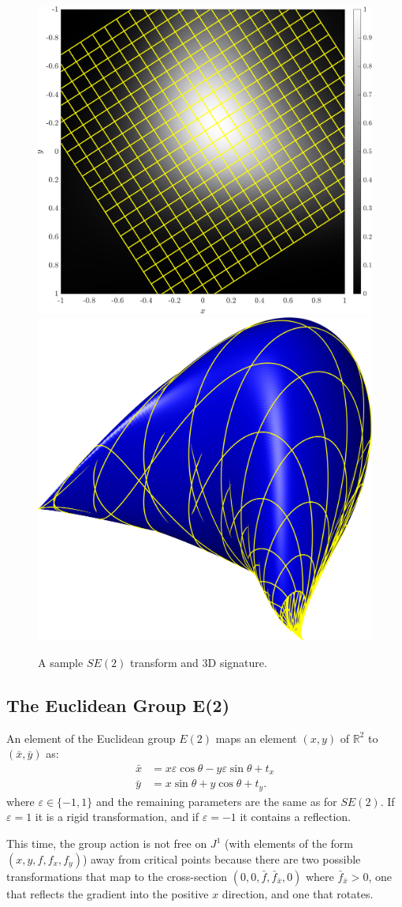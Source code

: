 \documentclass[review,onefignum,onetabnum]{siamonline190516}
\begin{document}
\begin{figure}
\centering
\includegraphics[width=.45\textwidth]{Figs/f_transformed_SE2.png}
\includegraphics[width=.45\textwidth]{Figs/SE2_signature.png}
\caption{A sample $SE(2)$ transform and 3D signature.}
\label{fig:SE2}
\end{figure}

\subsection{The Euclidean Group E(2)}
An element of the Euclidean group $E(2)$ maps an element $(x, y)$ of
$\mathbb{R}^2$ to $(\bar{x}, \bar{y})$ as:
\begin{equation*}
  \begin{aligned}
    \bar{x} &=  x\varepsilon\cos\theta  - y\varepsilon\sin\theta + t_x \\
    \bar{y} &= x\sin\theta  + y\cos\theta + t_y.
  \end{aligned}
\end{equation*}
where $\varepsilon \in \{-1, 1\}$ and the remaining parameters are the same
as for $SE(2)$. If $\varepsilon = 1$ it is a rigid transformation, and if
$\varepsilon = -1$ it contains a reflection.

This time, the group action is not free on $J^1$ (with elements of the form
$(x, y, f, f_x, f_y)$) away from critical points because there are two
possible transformations that map to the cross-section $(0, 0, \bar{f},
\bar{f}_{\bar{x}}, 0)$ where $\bar{f}_{\bar{x}} > 0$, one that reflects the
gradient into the positive $x$ direction, and one that rotates. 
\end{document}
